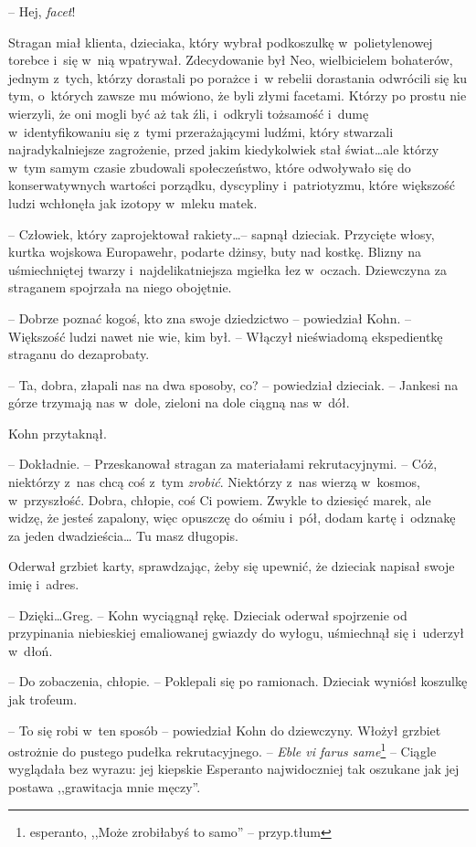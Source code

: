 \documentclass[oneside,polish,11pt,sfheadings]{mwbk}
\begin{document}
-- Hej, \emph{facet}!

Stragan miał klienta, dzieciaka, który wybrał podkoszulkę w~polietylenowej torebce i~się w~nią wpatrywał. Zdecydowanie był Neo,
wielbicielem bohaterów, jednym z~tych, którzy dorastali po porażce i~w rebelii dorastania odwrócili się ku tym, o~których zawsze mu mówiono, że
byli złymi facetami. Którzy po prostu nie wierzyli, że oni mogli być aż
tak źli, i~odkryli tożsamość i~dumę w~identyfikowaniu się z~tymi
przerażającymi ludźmi, który stwarzali najradykalniejsze zagrożenie,
przed jakim kiedykolwiek stał świat\ldots ale którzy w~tym samym czasie
zbudowali społeczeństwo, które odwoływało się do konserwatywnych
wartości porządku, dyscypliny i~patriotyzmu, które większość ludzi
wchłonęła jak izotopy w~mleku matek.

-- Człowiek, który zaprojektował rakiety\ldots -- sapnął dzieciak. Przycięte
włosy, kurtka wojskowa Europawehr, podarte dżinsy, buty nad kostkę.
Blizny na uśmiechniętej twarzy i~najdelikatniejsza mgiełka łez w~oczach.
Dziewczyna za straganem spojrzała na niego obojętnie.

-- Dobrze poznać kogoś, kto zna swoje dziedzictwo -- powiedział Kohn. -- Większość ludzi nawet nie wie, kim był. -- Włączył nieświadomą
ekspedientkę straganu do dezaprobaty.

-- Ta, dobra, złapali nas na dwa sposoby, co? -- powiedział dzieciak. -- Jankesi na górze trzymają nas w~dole, zieloni na dole ciągną nas w~dół.

Kohn przytaknął. 

-- Dokładnie. -- Przeskanował stragan za materiałami
rekrutacyjnymi. -- Cóż, niektórzy z~nas chcą coś z~tym \emph{zrobić}.
Niektórzy z~nas wierzą w~kosmos, w~przyszłość. Dobra, chłopie, coś Ci
powiem. Zwykle to dziesięć marek, ale widzę, że jesteś zapalony, więc
opuszczę do ośmiu i~pół, dodam kartę i~odznakę za jeden dwadzieścia\ldots
Tu masz długopis.

Oderwał grzbiet karty, sprawdzając, żeby się upewnić, że dzieciak
napisał swoje imię i~adres.

-- Dzięki\ldots Greg. -- Kohn wyciągnął rękę. Dzieciak oderwał spojrzenie od
przypinania niebieskiej emaliowanej gwiazdy do wyłogu, uśmiechnął się i~uderzył w~dłoń.

-- Do zobaczenia, chłopie. -- Poklepali się po ramionach. Dzieciak wyniósł
koszulkę jak trofeum.

-- To się robi w~ten sposób -- powiedział Kohn do dziewczyny. Włożył
grzbiet ostrożnie do pustego pudełka rekrutacyjnego. -- \emph{Eble vi
farus same}\footnote{esperanto, ,,Może zrobiłabyś to samo'' -- przyp.tłum} -- Ciągle wyglądała bez wyrazu: jej kiepskie Esperanto najwidoczniej tak
oszukane jak jej postawa ,,grawitacja mnie męczy''.
\end{document}
